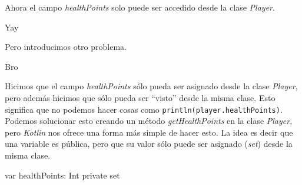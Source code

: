     Ahora el campo \textit{healthPoints} solo puede ser accedido desde la clase \textit{Player}.
    
    \begin{center}
      Yay
    \end{center}

    Pero introducimos otro problema.

    \begin{center}
      Bro
    \end{center}

    Hicimos que el campo \textit{healthPoints} sólo pueda ser asignado desde la clase 
    \textit{Player}, pero además hicimos que sólo pueda ser \enquote{visto} desde la misma clase.
    Esto significa que no podemos hacer cosas como \texttt{println(player.healthPoints)}.
    Podemos solucionar esto creando un método \textit{getHealthPoints} en la clase \textit{Player},
    pero \textit{Kotlin} nos ofrece una forma más simple de hacer esto.
    La idea es decir que una variable es pública, pero que su valor sólo puede ser asignado 
    (\textit{set}) desde la misma clase.

    \begin{kotlin}
      var healthPoints: Int private set
    \end{kotlin}
